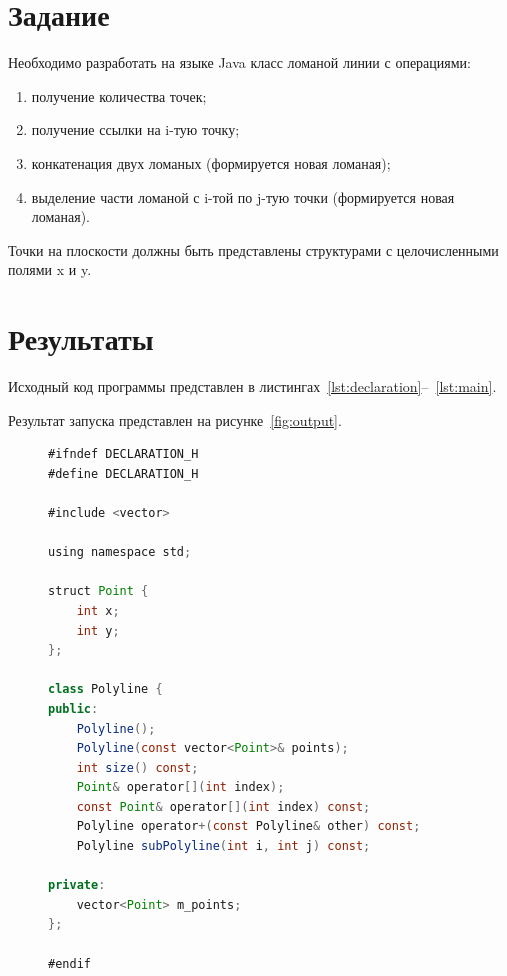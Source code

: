 \documentclass[a4paper, 14pt]{extarticle}
\begin{document}
\renewcommand{\ttdefault}{pcr}

\setlength{\tabcolsep}{3pt}
\newpage
\setcounter{page}{2}

\section{Задание}\label{Sect::task}

Необходимо разработать на языке Java класс ломаной линии с операциями:

\begin{enumerate}
    \item получение количества точек;
    \item получение ссылки на i-тую точку;
    \item конкатенация двух ломаных (формируется
новая ломаная);
    \item выделение части ломаной с i-той по j-тую
точки (формируется новая ломаная).
\end{enumerate}

Точки на плоскости должны быть представлены
структурами с целочисленными полями x и y. 

\section{Результаты}\label{Sect::res}

Исходный код программы представлен в листингах~\ref{lst:declaration}--~\ref{lst:main}.

Результат запуска представлен на рисунке~\ref{fig:output}.

\begin{figure}[!htb]
\begin{lstlisting}[language=Java,caption={Объявление класса Polyline},label={lst:declaration}]
#ifndef DECLARATION_H
#define DECLARATION_H

#include <vector>

using namespace std;

struct Point {
    int x;
    int y;
};

class Polyline {
public:
    Polyline();
    Polyline(const vector<Point>& points);
    int size() const;
    Point& operator[](int index);
    const Point& operator[](int index) const;
    Polyline operator+(const Polyline& other) const;
    Polyline subPolyline(int i, int j) const;
    
private:
    vector<Point> m_points;
};

#endif

\end{lstlisting}
\end{figure}
\end{document}
